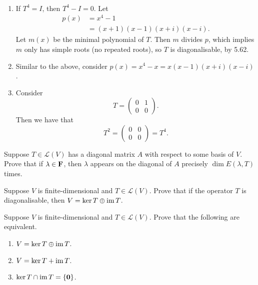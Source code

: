 \begin{solution} \
\begin{enumerate}[label=(\roman*)]
\item If $T^4=I$, then $T^4-I=0$. Let
\begin{align*}
p(x)&=x^4-1\\
&=(x+1)(x-1)(x+i)(x-i).
\end{align*}
Let $m(x)$ be the minimal polynomial of $T$. 
Then $m$ divides $p$, which implies $m$ only has simple roots (no repeated roots), so $T$ is diagonalisable, by 5.62.

\item Similar to the above, consider $p(x)=x^4-x=x(x-1)(x+i)(x-i)$.

\item Consider
\[T=\begin{pmatrix}
0&1\\
0&0
\end{pmatrix}.\]
Then we have that
\[T^2=\begin{pmatrix}
0&0\\
0&0
\end{pmatrix}=T^4.\]
\end{enumerate}
\end{solution}

\begin{exercise}
Suppose $T\in\mathcal{L}(V)$ has a diagonal matrix $A$ with respect to some basis of $V$. Prove that if $\lambda\in\mathbf F$, then $\lambda$ appears on the diagonal of $A$ precisely $\dim E(\lambda,T)$ times.
\end{exercise}

\begin{exercise}
Suppose $V$ is finite-dimensional and $T\in\mathcal{L}(V)$. Prove that if the operator $T$ is diagonalisable, then $V=\ker T\oplus\operatorname{im} T$.
\end{exercise}

\begin{exercise}
Suppose $V$ is finite-dimensional and $T\in\mathcal{L}(V)$. Prove that the following are equivalent.
\begin{enumerate}[label=(\roman*)]
\item $V=\ker T\oplus\operatorname{im} T$.
\item $V=\ker T+\operatorname{im} T$.
\item $\ker T\cap\operatorname{im} T=\{\vb{0}\}$.
\end{enumerate}
\end{exercise}

